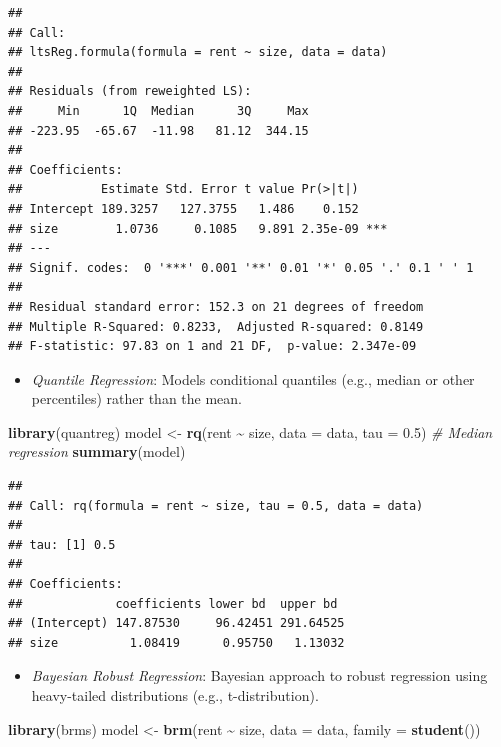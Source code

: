 \documentclass[
]{article}
\newenvironment{Shaded}{\begin{snugshade}}{\end{snugshade}}
\newcommand{\AttributeTok}[1]{\textcolor[rgb]{0.13,0.29,0.53}{#1}}
\newcommand{\CommentTok}[1]{\textcolor[rgb]{0.56,0.35,0.01}{\textit{#1}}}
\newcommand{\FloatTok}[1]{\textcolor[rgb]{0.00,0.00,0.81}{#1}}
\newcommand{\FunctionTok}[1]{\textcolor[rgb]{0.13,0.29,0.53}{\textbf{#1}}}
\newcommand{\NormalTok}[1]{#1}
\newcommand{\OtherTok}[1]{\textcolor[rgb]{0.56,0.35,0.01}{#1}}
\newcommand{\SpecialCharTok}[1]{\textcolor[rgb]{0.81,0.36,0.00}{\textbf{#1}}}
\providecommand{\tightlist}{%
  \setlength{\itemsep}{0pt}\setlength{\parskip}{0pt}}
\begin{document}
\begin{verbatim}
## 
## Call:
## ltsReg.formula(formula = rent ~ size, data = data)
## 
## Residuals (from reweighted LS):
##     Min      1Q  Median      3Q     Max 
## -223.95  -65.67  -11.98   81.12  344.15 
## 
## Coefficients:
##           Estimate Std. Error t value Pr(>|t|)    
## Intercept 189.3257   127.3755   1.486    0.152    
## size        1.0736     0.1085   9.891 2.35e-09 ***
## ---
## Signif. codes:  0 '***' 0.001 '**' 0.01 '*' 0.05 '.' 0.1 ' ' 1
## 
## Residual standard error: 152.3 on 21 degrees of freedom
## Multiple R-Squared: 0.8233,  Adjusted R-squared: 0.8149 
## F-statistic: 97.83 on 1 and 21 DF,  p-value: 2.347e-09
\end{verbatim}

\begin{itemize}
\tightlist
\item
  \emph{Quantile Regression}: Models conditional quantiles (e.g., median
  or other percentiles) rather than the mean.
\end{itemize}

\begin{Shaded}
\begin{Highlighting}[]
\FunctionTok{library}\NormalTok{(quantreg)}
\NormalTok{model }\OtherTok{\textless{}{-}} \FunctionTok{rq}\NormalTok{(rent }\SpecialCharTok{\textasciitilde{}}\NormalTok{ size, }\AttributeTok{data =}\NormalTok{ data, }\AttributeTok{tau =} \FloatTok{0.5}\NormalTok{)  }\CommentTok{\# Median regression}
\FunctionTok{summary}\NormalTok{(model)}
\end{Highlighting}
\end{Shaded}

\begin{verbatim}
## 
## Call: rq(formula = rent ~ size, tau = 0.5, data = data)
## 
## tau: [1] 0.5
## 
## Coefficients:
##             coefficients lower bd  upper bd 
## (Intercept) 147.87530     96.42451 291.64525
## size          1.08419      0.95750   1.13032
\end{verbatim}

\begin{itemize}
\tightlist
\item
  \emph{Bayesian Robust Regression}: Bayesian approach to robust
  regression using heavy-tailed distributions (e.g., t-distribution).
\end{itemize}

\begin{Shaded}
\begin{Highlighting}[]
\FunctionTok{library}\NormalTok{(brms)}
\NormalTok{model }\OtherTok{\textless{}{-}} \FunctionTok{brm}\NormalTok{(rent }\SpecialCharTok{\textasciitilde{}}\NormalTok{ size, }\AttributeTok{data =}\NormalTok{ data, }\AttributeTok{family =} \FunctionTok{student}\NormalTok{())}
\end{Highlighting}
\end{Shaded}
\end{document}
